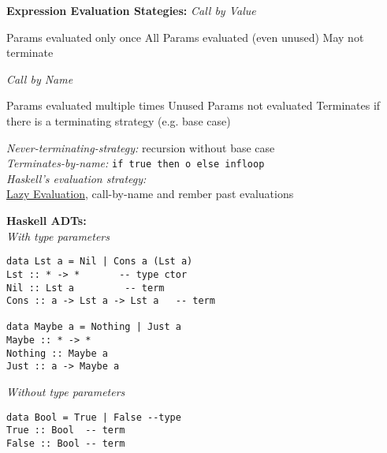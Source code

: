 \begin{breakbox}
\textbf{Expression Evaluation Stategies:}
\emph{Call by Value}
\begin{itemize}
	\pro Params evaluated only once
	\con All Params evaluated (even unused)
	\con May not terminate\\
\end{itemize}
\emph{Call by Name}
\begin{itemize}
	\con Params evaluated multiple times
	\pro Unused Params not evaluated
	\pro Terminates if there is a terminating strategy (e.g. base case)\\
\end{itemize}
\emph{Never-terminating-strategy:} recursion without base case \\
\emph{Terminates-by-name:} \texttt{if true then o else infloop}\\
\emph{Haskell's evaluation strategy:}\\\underline{Lazy Evaluation}, call-by-name and rember past evaluations
\end{breakbox}

\begin{breakbox}
\textbf{Haskell ADTs:}\\
\emph{With type parameters}
\vspace{-5mm}
\begin{verbatim}
data Lst a = Nil | Cons a (Lst a)
Lst :: * -> * 		-- type ctor
Nil :: Lst a 		 -- term
Cons :: a -> Lst a -> Lst a   -- term

data Maybe a = Nothing | Just a
Maybe :: * -> *
Nothing :: Maybe a
Just :: a -> Maybe a
\end{verbatim}
\emph{Without type parameters}
\vspace{-5mm}
\begin{verbatim}
data Bool = True | False --type
True :: Bool  -- term
False :: Bool -- term
\end{verbatim}
\end{breakbox}

